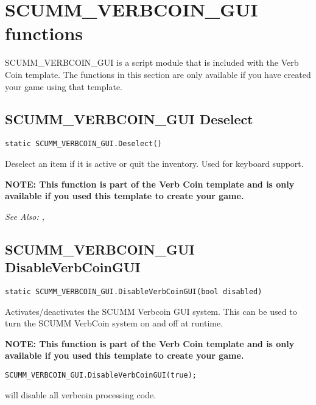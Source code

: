 \section{SCUMM_VERBCOIN_GUI functions}

SCUMM_VERBCOIN_GUI is a script module that is included with the Verb Coin template.
The functions in this section are only available if you have created your game
using that template.




\subsection{SCUMM_VERBCOIN_GUI Deselect}\label{SCUMM_VERBCOIN_GUI.Deselect}%

\begin{verbatim}
static SCUMM_VERBCOIN_GUI.Deselect()
\end{verbatim}
Deselect an item if it is active or quit the inventory. Used for keyboard support.

\bf{NOTE:} This function is part of the Verb Coin template and is only available if
you used this template to create your game.

\it{See Also:} ,


\subsection{SCUMM_VERBCOIN_GUI DisableVerbCoinGUI}\label{SCUMM_VERBCOIN_GUI.DisableVerbCoinGUI}%

\begin{verbatim}
static SCUMM_VERBCOIN_GUI.DisableVerbCoinGUI(bool disabled)
\end{verbatim}
Activates/deactivates the SCUMM Verbcoin GUI system. This can be used to turn the SCUMM
VerbCoin system on and off at runtime.

\bf{NOTE:} This function is part of the Verb Coin template and is only available if
you used this template to create your game.

\begin{verbatim}
SCUMM_VERBCOIN_GUI.DisableVerbCoinGUI(true);
\end{verbatim}

will disable all verbcoin processing code.


